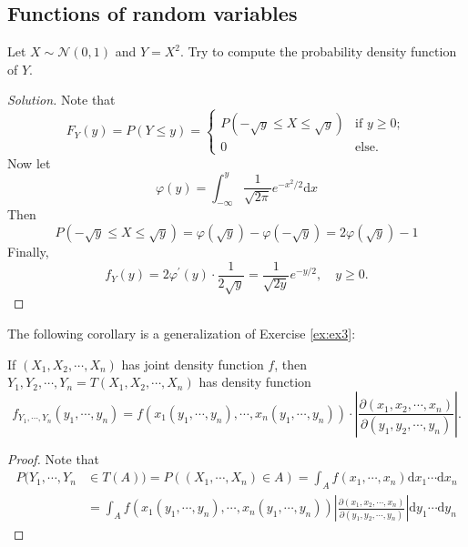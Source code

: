 \documentclass[11pt,singlecolumn, openany, citestyle=authoryear]{elegantbook}
\begin{document}
\begin{CJK}{UTF8}{gbsn}
\section{Functions of random variables}
\begin{example}
    Let $X\sim \mathcal{N}(0,1)$ and $Y=X^2$. Try to compute the probability density 
    function of $Y$.
\end{example}
\begin{proof}[Solution]
    Note that $$
    F_Y(y) = P(Y\leqslant y)=
    \begin{cases}
        P(-\sqrt{y}\leqslant X \leqslant \sqrt{y}) &\text{if } y \geqslant 0;\\
        0 & \text{else}.
    \end{cases}
    $$
    Now let 
    $$
        \varphi(y)= \int_{-\infty}^y \frac{1}{\sqrt{2\pi}}e^{-x^2/2}\mathrm{d}x
    $$
    Then 
    $$
    P(-\sqrt{y}\leqslant X \leqslant \sqrt{y})=\varphi(\sqrt{y})-\varphi(-\sqrt{y})
    =2\varphi(\sqrt{y})-1
    $$
    Finally,
    $$
    f_Y(y)=2\varphi^\prime(y)\cdot \frac{1}{2\sqrt{y}}=\frac{1}{\sqrt{2y}}e^{-y/2},
    \quad y\geqslant 0.
    $$
\end{proof}
The following corollary is a generalization of Exercise \ref{ex:ex3}:
\begin{corollary}
    If $(X_1,X_2,\cdots,X_n)$ has joint density function $f$, then $Y_1,Y_2,\cdots,Y_n
    =T(X_1,X_2,\cdots,X_n)$ has density function 
    $$
    f_{Y_1,\cdots,Y_n}(y_1,\cdots,y_n) = f(x_1(y_1,\cdots,y_n),\cdots,x_n(y_1,\cdots,y_n))
    \cdot \left| \frac{\partial (x_1,x_2,\cdots,x_n)}{\partial (y_1,y_2,\cdots,y_n)}\right|.
    $$ 
\end{corollary}
\begin{proof}
    Note that 
    \begin{align*}
        P(Y_1,\cdots,Y_n&\in T(A))=P((X_1,\cdots,X_n)\in A)= \int_A f(x_1,\cdots,x_n)\mathrm{d}x_1 \cdots \mathrm{d}x_n\\
        &= \int_A f(x_1(y_1,\cdots,y_n),\cdots,x_n(y_1,\cdots,y_n))
        \left| \frac{\partial (x_1,x_2,\cdots,x_n)}{\partial (y_1,y_2,\cdots,y_n)}\right|
        \mathrm{d}y_1 \cdots \mathrm{d}y_n
    \end{align*}
\end{proof}


\end{CJK}
\end{document}
